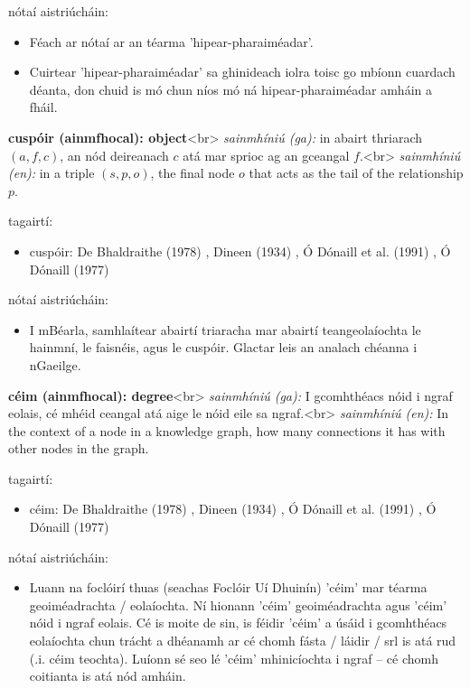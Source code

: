 \documentclass{article}
\begin{document}
nótaí aistriúcháin:
\begin{itemize}
	\item Féach ar nótaí ar an téarma 'hipear-pharaiméadar'.
	\item Cuirtear 'hipear-pharaiméadar' sa ghinideach iolra toisc go mbíonn cuardach déanta, don chuid is mó chun níos mó ná hipear-pharaiméadar amháin a fháil.
\end{itemize}


\textbf{cuspóir (ainmfhocal): object}<br>
\textit{sainmhíniú (ga):} in abairt thriarach $(a,f,c)$, an nód deireanach $c$ atá mar sprioc ag an gceangal $f$.<br>
\textit{sainmhíniú (en):} in a triple $(s,p,o)$, the final node $o$ that acts as the tail of the relationship $p$.

tagairtí:
\begin{itemize}
	\item cuspóir: De Bhaldraithe (1978) \cite{de-bhaldraithe}, Dineen (1934) \cite{dineen}, Ó Dónaill et al. (1991) \cite{focloir-beag}, Ó Dónaill (1977) \cite{odonaill}
\end{itemize}

nótaí aistriúcháin:
\begin{itemize}
	\item I mBéarla, samhlaítear abairtí triaracha mar abairtí teangeolaíochta le hainmní, le faisnéis, agus le cuspóir. Glactar leis an analach chéanna i nGaeilge.
\end{itemize}


\textbf{céim (ainmfhocal): degree}<br>
\textit{sainmhíniú (ga):} I gcomhthéacs nóid i ngraf eolais, cé mhéid ceangal atá aige le nóid eile sa ngraf.<br>
\textit{sainmhíniú (en):} In the context of a node in a knowledge graph, how many connections it has with other nodes in the graph.

tagairtí:
\begin{itemize}
	\item céim: De Bhaldraithe (1978) \cite{de-bhaldraithe}, Dineen (1934) \cite{dineen}, Ó Dónaill et al. (1991) \cite{focloir-beag}, Ó Dónaill (1977) \cite{odonaill}
\end{itemize}

nótaí aistriúcháin:
\begin{itemize}
	\item Luann na foclóirí thuas (seachas Foclóir Uí Dhuinín) 'céim' mar téarma geoiméadrachta / eolaíochta. Ní hionann 'céim' geoiméadrachta agus 'céim' nóid i ngraf eolais. Cé is moite de sin, is féidir 'céim' a úsáid i gcomhthéacs eolaíochta chun trácht a dhéanamh ar cé chomh fásta / láidir / srl is atá rud (.i. céim teochta). Luíonn sé seo lé 'céim' mhinicíochta i ngraf -- cé chomh coitianta is atá nód amháin.
\end{itemize}
\end{document}
